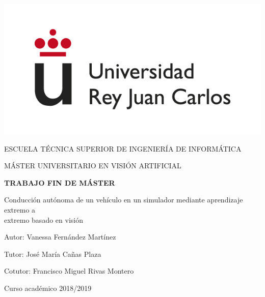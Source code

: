 \begin{titlepage}
	\begin{center}
		\vspace*{3mm}
		\begin{center}
			\includegraphics[width=0.4\linewidth]{figures/logo.jpg}
		\end{center}
		\vspace{6.5mm}
		
		\fontsize{15.5}{14}\selectfont ESCUELA TÉCNICA SUPERIOR DE INGENIERÍA DE INFORMÁTICA
		\vspace{13mm}
		
		\fontsize{14}{14}\selectfont MÁSTER UNIVERSITARIO EN VISIÓN ARTIFICIAL 
		
		\vspace{55pt}
		
		\fontsize{15.7}{14}\selectfont \textbf{TRABAJO FIN DE MÁSTER} 
		
		\vspace{20mm}
		\begin{huge}
			Conducción autónoma de un vehículo en un \vspace{0.4cm} simulador mediante aprendizaje extremo a \\ \vspace{0.4cm} extremo basado en visión
		\end{huge}
		
		\vspace{20mm}
		
		\begin{large}
			Autor: Vanessa Fernández Martínez
			
			Tutor: José María Cañas Plaza
			
			Cotutor: Francisco Miguel Rivas Montero
			
			\vspace{10mm}
		\end{large}
		\begin{normalsize}
			Curso académico 2018/2019		
		\end{normalsize}
		\vspace{10mm}
		
	\end{center}
	
\end{titlepage}